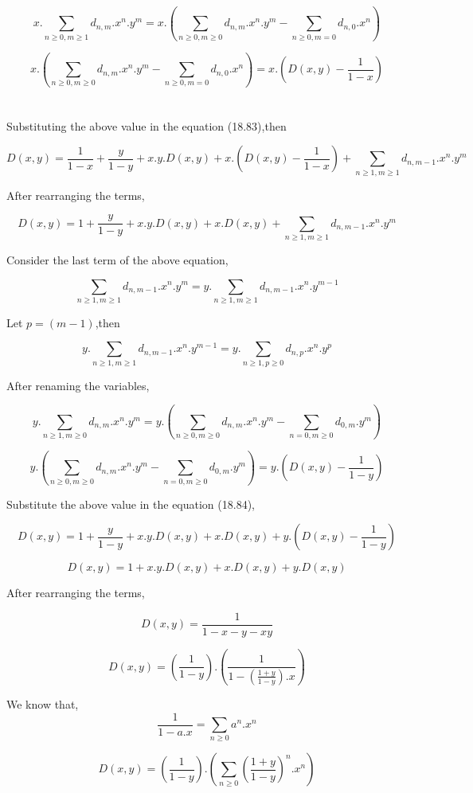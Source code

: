 $$x.\sum_{n \geq 0,m \geq 1}d_{n,m}.x^n.y^m = x.\left(\sum_{n \geq 0,m \geq 0}d_{n,m}.x^{n}.y^{m} - \sum_{n \geq 0,m = 0}d_{n,0}.x^{n} \right)$$

$$x.\left(\sum_{n \geq 0,m \geq 0}d_{n,m}.x^{n}.y^{m} - \sum_{n \geq 0,m = 0}d_{n,0}.x^{n} \right) = x.\left(D(x,y)-\frac{1}{1-x} \right) $$ 
\\ \\
Substituting the above value in the equation (18.83),then

$$D(x,y) = \frac{1}{1-x} + \frac{y}{1-y} + x.y.D(x,y) + x.\left(D(x,y)-\frac{1}{1-x} \right) +\sum_{n \geq 1,m \geq 1}d_{n,m-1}.x^{n}.y^{m}$$

After rearranging the terms,

\begin{equation}
D(x,y) = 1 + \frac{y}{1-y} + x.y.D(x,y) + x.D(x,y) + \sum_{n \geq 1,m \geq 1}d_{n,m-1}.x^{n}.y^{m}
\end{equation}

Consider the last term of the above equation,

$$\sum_{n \geq 1,m \geq 1}d_{n,m-1}.x^{n}.y^{m} = y.\sum_{n \geq 1,m \geq 1}d_{n,m-1}.x^{n}.y^{m-1} $$

Let $p=(m-1)$,then 

$$y.\sum_{n \geq 1,m \geq 1}d_{n,m-1}.x^{n}.y^{m-1} = y.\sum_{n \geq 1,p \geq 0}d_{n,p}.x^{n}.y^{p}$$

After renaming the variables,

$$y.\sum_{n \geq 1,m \geq 0}d_{n,m}.x^{n}.y^{m} = y.\left(\sum_{n \geq 0,m \geq 0}d_{n,m}.x^n.y^m - \sum_{n=0,m \geq 0}d_{0,m}.y^{m} \right) $$

$$y.\left(\sum_{n \geq 0,m \geq 0}d_{n,m}.x^n.y^m - \sum_{n=0,m \geq 0}d_{0,m}.y^{m} \right) = y.\left(D(x,y) - \frac{1}{1-y} \right) $$

Substitute the above value in the equation (18.84),

$$D(x,y) = 1 + \frac{y}{1-y} + x.y.D(x,y) + x.D(x,y) + y.\left(D(x,y) - \frac{1}{1-y} \right)$$

$$D(x,y) = 1 + x.y.D(x,y) + x.D(x,y) + y.D(x,y) $$

After rearranging the terms,

$$D(x,y) = \frac{1}{1-x-y-xy} $$

$$D(x,y) = \left(\frac{1}{1-y}\right).\left(\frac{1}{1-\left(\frac{1+y}{1-y}\right).x}\right) $$

We know that,
$$\frac{1}{1-a.x} = \sum_{n \geq 0}a^n.x^n $$

$$D(x,y) = \left(\frac{1}{1-y}\right).\left(\sum_{n \geq 0}{\left(\frac{1+y}{1-y} \right)}^n.x^n \right) $$

